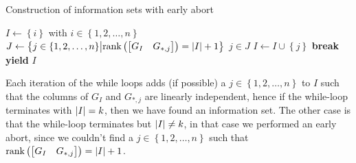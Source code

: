 \begin{algorithm}[H]
\caption{Construction of information sets with early abort}\label{alg:information_set_early_abort}
\begin{algorithmic}
  \Loop
    \State $I \gets \left\{i\right\}$ with $i \in \left\{1, 2, \ldots, n\right\}$ 
       \State $J \gets \left\{j \in \left\{1, 2, \ldots, n\right\} \middle| \textnormal{rank}\left(\begin{bmatrix} G_I & G_{*, j} \end{bmatrix}\right) = \left\lvert I\right\rvert + 1\right\}$
          \State $j \in J$ 
          \State $I \gets I \cup \left\{j\right\}$
       \Else
         \State \textbf{break}
       \EndIf
    \EndWhile
       \State \textbf{yield} $I$
    \EndIf
  \EndLoop
  \EndProcedure
\end{algorithmic}
\end{algorithm}
Each iteration of the while loops adds (if possible) a $j \in \left\{1, 2, \ldots, n\right\}$ to $I$ such that the columns of $G_I$ and $G_{*, j}$ are linearly independent, hence if the while-loop terminates with $\left\lvert I\right\rvert = k$, then we have found an information set. The other case is that the while-loop terminates but $\left\lvert I\right\rvert \neq k$, in that case we performed an early abort, since we couldn't find a $j \in \left\{1, 2, \ldots, n\right\}$ such that $\textnormal{rank}\left(\begin{bmatrix} G_I & G_{*, j} \end{bmatrix}\right) = \left\lvert I\right\rvert + 1$.
